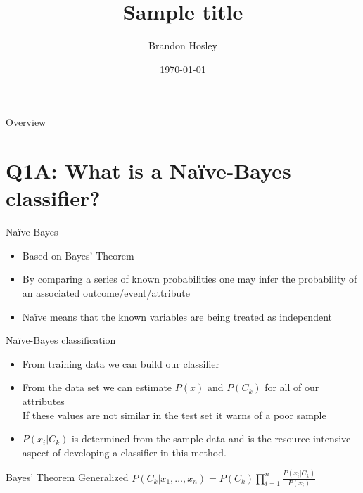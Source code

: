 \documentclass{beamer}
\title{Sample title}
\author{Brandon Hosley}
\institute{University of Illinois - Springfield}
\date{\today}
\begin{document}
\frame{\titlepage}

\begin{frame}{Overview}
\tableofcontents
\end{frame}

\section[Q1.1]{Q1A: What is a Na\"{i}ve-Bayes classifier?}

\begin{frame}{Na\"{i}ve-Bayes}
	\begin{itemize}[<+->]
		\item Based on Bayes' Theorem
		\item By comparing a series of known probabilities one may infer the probability of an associated outcome/event/attribute
		\item Na\"{i}ve means that the known variables are being treated as independent
	\end{itemize}
	
\end{frame}
\begin{frame}{Na\"{i}ve-Bayes classification}
	\begin{itemize}[<+->]
		\item From training data we can build our classifier
		\item From the data set we can estimate $P(x)$ and $P(C_k)$
			for all of our attributes \\
			If these values are not similar in the test set it warns of a poor sample
		\item $P(x_i|C_k)$ is determined from the sample data and is the resource intensive aspect of developing a classifier in this method.
	\end{itemize}
	\begin{exampleblock}{Bayes' Theorem Generalized} 
		$P(C_k|x_1,\ldots,x_n)=P(C_k)\prod_{i=1}^{n} \frac{P(x_i|C_k)}{P(x_i)}$ 
	\end{exampleblock}
\end{frame}
\end{document}

